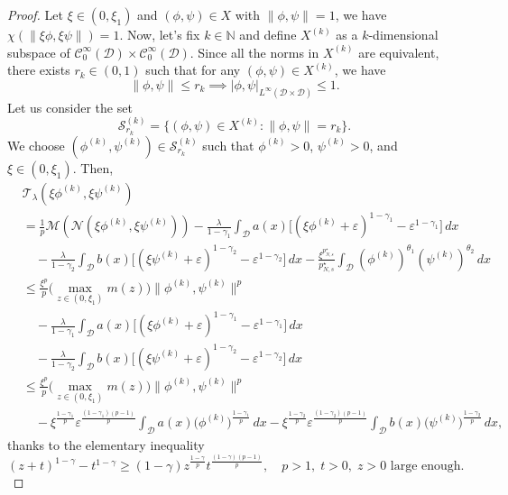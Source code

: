 \documentclass[10pt,a4paper]{amsart}
\numberwithin{equation}{section}
\begin{document}
\begin{proof}
Let $\xi\in (0,\xi_1)$ and $(\phi,\psi)\in X$ with $\| \phi,\psi\|=1$, we have 
$\chi(\| \xi\phi,\xi\psi\|)=1$. Now, let's fix $k\in \mathbb{N}$ and define 
$X^{(k)}$ as a $k$-dimensional subspace of 
$\mathcal{C}^\infty_0(\mathcal{D})\times \mathcal{C}^\infty_0(\mathcal{D})$. 
Since all the norms in $X^{(k)}$ are equivalent, there exists $r_k\in (0,1)$ 
such that for any $(\phi,\psi)\in X^{(k)}$, we have
$$
\| \phi,\psi\|\leq r_k \implies |\phi,\psi|_{L^\infty(\mathcal{D}\times\mathcal{D})}
\leq 1.
$$
Let us consider the set
$$
\mathscr{S}_{r_k}^{(k)}=\lbrace (\phi,\psi)\in X^{(k)}: \| \phi,\psi\|=r_k\rbrace.
$$
We choose $(\phi^{(k)},\psi^{(k)})\in \mathscr{S}_{r_k}^{(k)}$ such that 
$\phi^{(k)}> 0$, $\psi^{(k)}> 0$, and $\xi\in (0,\xi_1)$. Then,
\begin{align*}
&\mathcal{T}_{\lambda}(\xi\phi^{(k)},\xi\psi^{(k)}) \\
&=\frac{1}{p}\mathscr{M}(\mathcal{N}(\xi\phi^{(k)},\xi\psi^{(k)}))
 -\frac{\lambda}{1-\gamma_1}\int_\mathcal{D} a(x)
 \Big[(\xi\phi^{(k)}+\varepsilon)^{1-\gamma_1}-\varepsilon^{1-\gamma_1}\Big]\,dx\\
&\quad -\frac{\lambda}{1-\gamma_2}\int_\mathcal{D} b(x)
 \Big[(\xi\psi^{(k)}+\varepsilon)^{1-\gamma_2}-\varepsilon^{1-\gamma_2}\Big]\,dx
 -\frac{\xi^{p^\star_{N,s}}}{p^\star_{N,s}}\int_\mathcal{D} 
  (\phi^{(k)})^{\theta_1}(\psi^{(k)})^{\theta_2}\,dx\\
&\leq\frac{\xi^p}{p}\Big(\max_{z\in(0,\xi_1)}m(z)
 \Big)\| \phi^{(k)},\psi^{(k)}\|^p\\
&\quad -\frac{\lambda}{1-\gamma_1}\int_\mathcal{D} a(x)
 \Big[(\xi\phi^{(k)}+\varepsilon)^{1-\gamma_1}-\varepsilon^{1-\gamma_1}\Big]\,dx\\
&\quad -\frac{\lambda}{1-\gamma_2}\int_\mathcal{D} b(x)
\Big[(\xi\psi^{(k)}+\varepsilon)^{1-\gamma_2}-\varepsilon^{1-\gamma_2}\Big]\,dx\\
&\leq\frac{\xi^p}{p}\Big(\max_{z\in(0,\xi_1)}m(z)
 \Big)\| \phi^{(k)},\psi^{(k)}\|^p\\
&\quad -\xi^\frac{1-\gamma_1}{p}\varepsilon^\frac{(1-\gamma_1)(p-1)}{p}
 \int_\mathcal{D}a(x)\big(\phi^{(k)}\big)^\frac{1-\gamma_1}{p}\,dx
 -\xi^\frac{1-\gamma_2}{p}\varepsilon^\frac{(1-\gamma_2)(p-1)}{p}
 \int_\mathcal{D}b(x)\big(\psi^{(k)}\big)^\frac{1-\gamma_2}{p}\,dx,
\end{align*}
thanks to the elementary inequality
$$
(z+t)^{1-\gamma}-t^{1-\gamma}
\geq (1-\gamma)z^\frac{1-\gamma}{p}t^\frac{(1-\gamma)(p-1)}{p},\quad
 p>1,\; t>0,\; z>0 \text{ large enough}.
$$
\end{proof}
\end{document}
